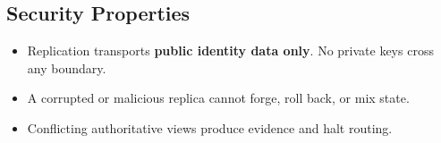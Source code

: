 \documentclass[
]{article}
\providecommand{\tightlist}{%
  \setlength{\itemsep}{0pt}\setlength{\parskip}{0pt}}
\begin{document}
\hypertarget{security-properties}{%
\subsection{Security Properties}\label{security-properties}}

\begin{itemize}
\tightlist
\item
  Replication transports \textbf{public identity data only}. No private
  keys cross any boundary.
\item
  A corrupted or malicious replica cannot forge, roll back, or mix
  state.
\item
  Conflicting authoritative views produce evidence and halt routing.
\end{itemize}
\end{document}
